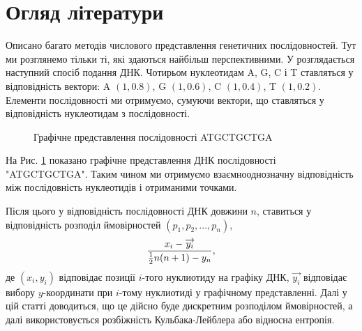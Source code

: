 \documentclass[14pt]{extarticle}
\begin{document}
\section{Огляд літератури}
Описано багато методів числового представлення генетичних послідовностей. Тут ми розглянемо тільки ті, які здаються найбільш перспективними. У \cite{l1} розглядається наступний спосіб подання ДНК. Чотирьом нуклеотидам A, G, C і T ставляться у відповідність вектори: A $(1,0.8)$, G $(1,0.6)$, C $(1,0.4)$, T $(1,0.2)$. Елементи послідовності ми отримуємо, сумуючи вектори, що ставляться у відповідність нуклеотидам з послідовності.\par
\begin{figure}[h!]
\begin{center}
\end{center}
\caption{Графічне представлення послідовності ATGCTGCTGA}
\label{fig:1}
\end{figure}
На Рис. \ref{fig:1} показано графічне представлення ДНК послідовності "ATGCTGCTGA". Таким чином ми отримуємо взаємнооднозначну відповідність між послідовність нуклеотидів і отриманими точками.\par
Після цього у відповідність послідовності ДНК довжини $n$, ставиться у відповідність розподіл ймовірностей $(p_1,p_2,...,p_n)$,
\[{x_i-\overrightarrow{y_i} \over{{1\over2}n(n+1)-y_n}},\]
де $(x_i,y_i)$ відповідає позиції $i$-того нуклиотиду на графіку ДНК, $\overrightarrow{y_i}$ відповідає вибору $y$-координати при $i$-тому нуклиотиді у графічному представленні. Далі у цій статті доводиться, що це дійсно буде дискретним розподілом ймовірностей, а далі використовується розбіжність Кульбака-Лейблера або відносна ентропія.\par
\end{document}
